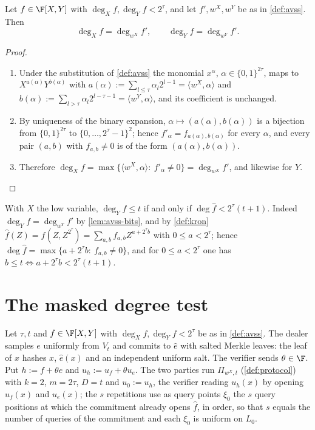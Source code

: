 {{\begin{lemma}\label{lem:avss-bits}
Let $f\in\F[X,Y]$ with $\deg_Xf,\deg_Yf<2^\tau$, and let $f',w^X,w^Y$ be as in
\ref{def:avss}. Then
\[
\deg_Xf=\deg_{w^X}f',\qquad \deg_Yf=\deg_{w^Y}f'.
\]
\end{lemma}

\begin{proof}\begin{enumerate}
\item Under the substitution of \ref{def:avss} the monomial $x^\alpha$,
$\alpha\in\{0,1\}^{2\tau}$, maps to $X^{a(\alpha)}Y^{b(\alpha)}$ with
$a(\alpha):=\sum_{l\le\tau}\alpha_l2^{l-1}=\langle w^X,\alpha\rangle$ and
$b(\alpha):=\sum_{l>\tau}\alpha_l2^{l-\tau-1}=\langle w^Y,\alpha\rangle$, and its coefficient
is unchanged.
\item By uniqueness of the binary expansion, $\alpha\mapsto(a(\alpha),b(\alpha))$ is a bijection
from $\{0,1\}^{2\tau}$ to $\{0,\dots,2^\tau-1\}^2$; hence $f'_\alpha=f_{a(\alpha),b(\alpha)}$ for every
$\alpha$, and every pair $(a,b)$ with $f_{a,b}\ne0$ is of the form $(a(\alpha),b(\alpha))$.
\item Therefore $\deg_Xf=\max\{\langle w^X,\alpha\rangle:\ f'_\alpha\ne0\}=\deg_{w^X}f'$, and
likewise for $Y$.
\end{enumerate}\end{proof}

\begin{remark}\label{rem:avss-y}\notready{}
With $X$ the low variable, $\deg_Yf\le t$ if and only if $\deg\hat f<2^\tau(t+1)$. Indeed
$\deg_Yf=\deg_{w^Y}f'$ by \ref{lem:avss-bits}, and by \ref{def:kron}
$\hat f(Z)=f(Z,Z^{2^\tau})=\sum_{a,b}f_{a,b}Z^{a+2^\tau b}$ with $0\le a<2^\tau$; hence
$\deg\hat f=\max\{a+2^\tau b:\ f_{a,b}\ne0\}$, and for $0\le a<2^\tau$ one has
$b\le t\iff a+2^\tau b<2^\tau(t+1)$.
\end{remark}

\section{The masked degree test}

\begin{definition}\label{con:avss-mask}
Let $\tau,t$ and $f\in\F[X,Y]$ with $\deg_Xf,\deg_Yf<2^\tau$ be as in \ref{def:avss}. The
dealer samples $e$ uniformly from $V_t$ and commits to $\hat e$ with salted Merkle leaves: the
leaf of $x$ hashes $x$, $\hat e(x)$ and an independent uniform salt. The verifier sends
$\theta\in\F$. Put $h:=f+\theta e$ and $u_h:=u_f+\theta u_e$. The two parties run
$\Pi_{w^X,t}$ (\ref{def:protocol}) with $k=2$, $m=2\tau$, $D=t$ and $u_0:=u_h$, the verifier
reading $u_h(x)$ by opening $u_f(x)$ and $u_e(x)$; the $s$
repetitions use as query points $\xi_0$ the $s$ query positions at which the commitment already opens $\hat f$, in order, so that $s$ equals the number of queries of the commitment and each $\xi_0$ is uniform on $L_0$.
\end{definition}

}}
